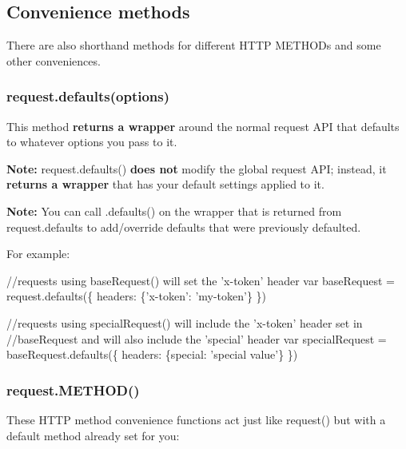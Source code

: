 \subsection*{Convenience methods}

There are also shorthand methods for different H\+T\+TP M\+E\+T\+H\+O\+Ds and some other conveniences.

\subsubsection*{request.\+defaults(options)}

This method {\bfseries returns a wrapper} around the normal request A\+PI that defaults to whatever options you pass to it.

{\bfseries Note\+:} {\ttfamily request.\+defaults()} {\bfseries does not} modify the global request A\+PI; instead, it {\bfseries returns a wrapper} that has your default settings applied to it.

{\bfseries Note\+:} You can call {\ttfamily .defaults()} on the wrapper that is returned from {\ttfamily request.\+defaults} to add/override defaults that were previously defaulted.

For example\+: 
\begin{DoxyCode}
//requests using baseRequest() will set the 'x-token' header
var baseRequest = request.defaults(\{
  headers: \{'x-token': 'my-token'\}
\})

//requests using specialRequest() will include the 'x-token' header set in
//baseRequest and will also include the 'special' header
var specialRequest = baseRequest.defaults(\{
  headers: \{special: 'special value'\}
\})
\end{DoxyCode}


\subsubsection*{request.\+M\+E\+T\+H\+O\+D()}

These H\+T\+TP method convenience functions act just like {\ttfamily request()} but with a default method already set for you\+:


